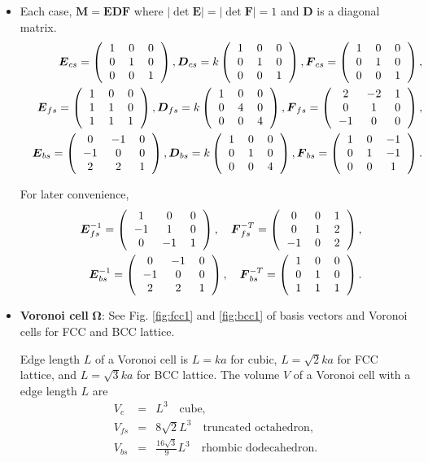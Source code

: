 \documentclass[10pt]{book}
\def\bm{\boldsymbol}
\newcommand{\bea}{\begin{eqnarray}}
\newcommand{\eea}{\end{eqnarray}}
\newcommand{\no}{\nonumber \\}
\newcommand{\threedmat}[9]
{\left(\begin{tabular}{ccc} {$#1$}&{$#2$}&{$#3$} \\
		{$#4$}&{$#5$}&{$#6$}\\
		{$#7$}&{$#8$}&{$#9$}\\
	    \end{tabular}\right)}
\begin{document}
\begin{itemize}
         	    
   \item Each case, ${\bm M}={\bm E}{\bm D}{\bm F}$ where $|\det{\bm E}|=|\det{\bm F}|=1$ and 
     ${\bm D}$ is a diagonal matrix. 
     \bea 
     & &{\bm E}_{cs}=\threedmat{1}{0}{0}{0}{1}{0}{0}{0}{1},
        {\bm D}_{cs}=k\threedmat{1}{0}{0}{0}{1}{0}{0}{0}{1},
        {\bm F}_{cs}=\threedmat{1}{0}{0}{0}{1}{0}{0}{0}{1},\no 
     & &{\bm E}_{fs}=\threedmat{1}{0}{0}{1}{1}{0}{1}{1}{1},
        {\bm D}_{fs}=k\threedmat{1}{0}{0}{0}{4}{0}{0}{0}{4},
        {\bm F}_{fs}=\threedmat{2}{-2}{1}{0}{1}{0}{-1}{0}{0},\no    
     & &{\bm E}_{bs}=\threedmat{0}{-1}{0}{-1}{0}{0}{2}{2}{1},
        {\bm D}_{bs}=k\threedmat{1}{0}{0}{0}{1}{0}{0}{0}{4},
        {\bm F}_{bs}=\threedmat{1}{0}{-1}{0}{1}{-1}{0}{0}{1}.
     \eea      
          
     For later convenience,
     \bea 
     & &{\bm E}^{-1}_{fs}=\threedmat{1}{0}{0}{-1}{1}{0}{0}{-1}{1},\quad 
        {\bm F}^{-T}_{fs}=\threedmat{0}{0}{1}{0}{1}{2}{-1}{0}{2}, \no 
     & &{\bm E}^{-1}_{bs}=\threedmat{0}{-1}{0}{-1}{0}{0}{2}{2}{1},\quad  
        {\bm F}^{-T}_{bs}=\threedmat{1}{0}{0}{0}{1}{0}{1}{1}{1}.
     \eea      
          
   \item {\bf Voronoi cell} ${\bm \Omega}$: See Fig.
   \ref{fig:fcc1} and \ref{fig:bcc1} of basis vectors and Voronoi cells for FCC and BCC lattice.
   
   Edge length $L$ of a Voronoi cell is $L=ka$  for cubic, 
   $L=\sqrt{2}k a$ for FCC lattice, and 
   $L=\sqrt{3}k a$ for BCC lattice.  
   The volume $V$ of a Voronoi cell with a edge length $L$ are
  \bea 
  V_{c}&=&L^3\quad \mbox{cube}, \no 
  V_{fs}&=&8\sqrt{2}L^3 \quad \mbox{truncated octahedron},\no 
  V_{bs}&=& \frac{16\sqrt{3}}{9}L^3\quad \mbox{rhombic dodecahedron}.
  \eea  
   

\end{itemize}
\end{document}
